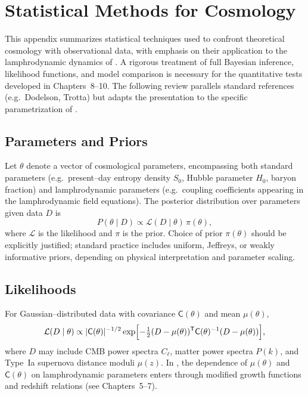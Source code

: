 
\chapter{Statistical Methods for Cosmology}
\label{app:cosmo-stats}

This appendix summarizes statistical techniques used to confront
theoretical cosmology with observational data, with emphasis on their
application to the lamphrodynamic dynamics of \rsvpabbr{}.  A rigorous
treatment of full Bayesian inference, likelihood functions, and
model comparison is necessary for the quantitative tests developed in
Chapters~8--10.  The following review parallels standard references
(e.g.\ Dodelson, Trotta) but adapts the presentation to the specific
parametrization of \rsvpabbr{}.

\section{Parameters and Priors}

Let $\theta$ denote a vector of cosmological parameters,
encompassing both standard parameters (e.g.\ present--day entropy
density $S_0$, Hubble parameter $H_0$, baryon fraction) and
lamphrodynamic parameters (e.g.\ coupling coefficients appearing in
the lamphrodynamic field equations).  The posterior distribution over
parameters given data $D$ is
\begin{equation}
\label{eq:bayes}
P(\theta\mid D) \propto \mathcal L(D\mid \theta)\,\pi(\theta),
\end{equation}
where $\mathcal L$ is the likelihood and $\pi$ is the prior.  Choice of
prior $\pi(\theta)$ should be explicitly justified; standard practice
includes uniform, Jeffreys, or weakly informative priors, depending on
physical interpretation and parameter scaling.

\section{Likelihoods}

For Gaussian--distributed data with covariance $\mathsf C(\theta)$ and
mean $\mu(\theta)$,
\begin{equation}
\mathcal L(D\mid \theta)
\propto |\mathsf C(\theta)|^{-1/2}
\exp\Bigl[-\tfrac12 (D-\mu(\theta))^{\sf T}\mathsf C(\theta)^{-1}
(D-\mu(\theta))\Bigr],
\end{equation}
where $D$ may include CMB power spectra $C_\ell$, matter power
spectra $P(k)$, and Type~Ia supernova distance moduli $\mu(z)$.
In \rsvpabbr{}, the dependence of $\mu(\theta)$ and $\mathsf C(\theta)$
on lamphrodynamic parameters enters through modified growth functions
and redshift relations (see Chapters~5--7).

